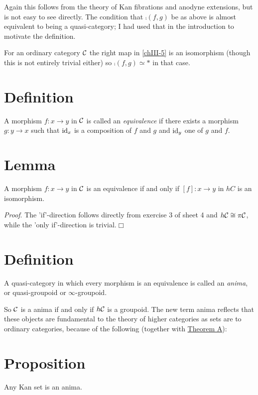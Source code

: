         Again this follows from the theory of Kan fibrations and anodyne extensions, but is not easy to see directly. The condition that $\comp(f, g)$ be as above is almost equivalent to being a quasi-category; I had used that in the introduction to motivate the definition.

        For an ordinary category $\mathcal{C}$ the right map in \ref{chIII-5} is an isomorphism (though this is not entirely trivial either) so $\comp(f, g) \simeq *$ in that case.

        \section{Definition}\label{chIII-8}
        A morphism $f \colon x \to y$ in $\mathcal{C}$ is called an \emph{equivalence} if there exists a morphism $g \colon y \to x$ such that $\operatorname{id}_x$ is a composition of $f$ and $g$ and $\operatorname{id}_y$ one of $g$ and $f$.

        \section{Lemma}
        A morphism $f \colon x \to y$ in $\mathcal{C}$ is an equivalence if and only if $\left[ f \right] \colon x \to y$ in $hC$ is an isomorphism.
        \smallskip

        \emph{Proof}. The 'if'-direction follows directly from exercise 3 of sheet 4 and $h\mathcal{C} \cong \pi \mathcal{C}$, while the 'only if'-direction is trivial.\hfill$\Box$

        \section{Definition}
        A quasi-category in which every morphism is an equivalence is called an \emph{anima}, or quasi-groupoid or $\infty$-groupoid.
        \smallskip

        So $\mathcal{C}$ is a anima if and only if $h\mathcal{C}$ is a groupoid. The new term anima reflects that these objects are fundamental to the theory of higher categories as sets are to ordinary categories, because of the following (together with \hyperref[chIII-4]{Theorem A}):

        \section{Proposition}
        Any Kan set is an anima.
        \smallskip

